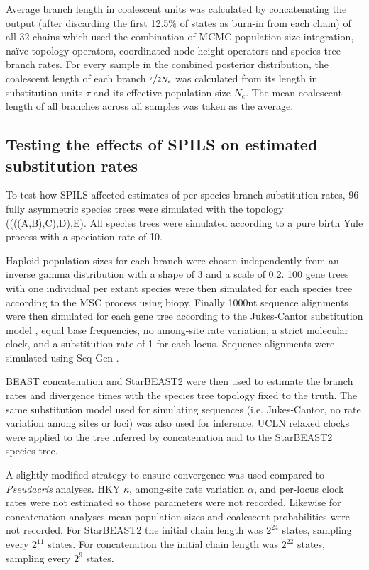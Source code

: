 \documentclass[nogrid]{MBE}%
\begin{document}
Average branch length in coalescent units was calculated by concatenating the
output (after discarding the first 12.5\% of states as burn-in from each chain) of all 32 chains
which used the combination of MCMC population size integration, na\"ive topology
operators, coordinated node height operators and species tree branch rates. For
every sample in the combined posterior distribution, the coalescent length of
each branch $\nicefrac{\tau}{2N_e}$ was calculated from its length in
substitution units $\tau$ and its effective population size $N_e$. The mean
coalescent length of all branches across all samples was taken as the average.

\subsection{Testing the effects of SPILS on estimated substitution rates}

To test how SPILS affected estimates of per-species branch substitution rates,
96 fully asymmetric species trees were simulated with the topology
((((A,B),C),D),E). All species trees were simulated according to a pure birth Yule
process \citep{Yule21} with a speciation rate of 10.

Haploid population sizes for each branch were chosen independently from an
inverse gamma distribution with a shape of 3 and a scale of 0.2. 100 gene trees
with one individual per extant species were then simulated for each species tree
according to the MSC process using biopy. Finally 1000nt sequence alignments
were then simulated for each gene tree according to the Jukes-Cantor
substitution model \citep{JUKES196921}, equal base frequencies, no among-site
rate variation, a strict molecular clock, and a substitution rate of 1 for each
locus. Sequence alignments were simulated using Seq-Gen \citep{Rambaut01061997}.

BEAST concatenation and StarBEAST2 were then used to estimate the branch rates
and divergence times with the species tree topology fixed to the truth. The same
substitution model used for simulating sequences (i.e. Jukes-Cantor, no rate
variation among sites or loci) was also used for inference. UCLN relaxed
clocks were applied to the tree inferred by concatenation and to the
StarBEAST2 species tree.

A slightly modified strategy to ensure convergence was used compared to
\textit{Pseudacris} analyses. HKY $\kappa$, among-site rate variation $\alpha$,
and per-locus clock rates were not estimated so those parameters were not
recorded. Likewise for concatenation analyses mean population sizes and coalescent
probabilities were not recorded. For StarBEAST2 the initial chain length was
$2^{24}$ states, sampling every $2^{11}$ states. For concatenation the initial
chain length was $2^{22}$ states, sampling every $2^{9}$ states.
\end{document}
